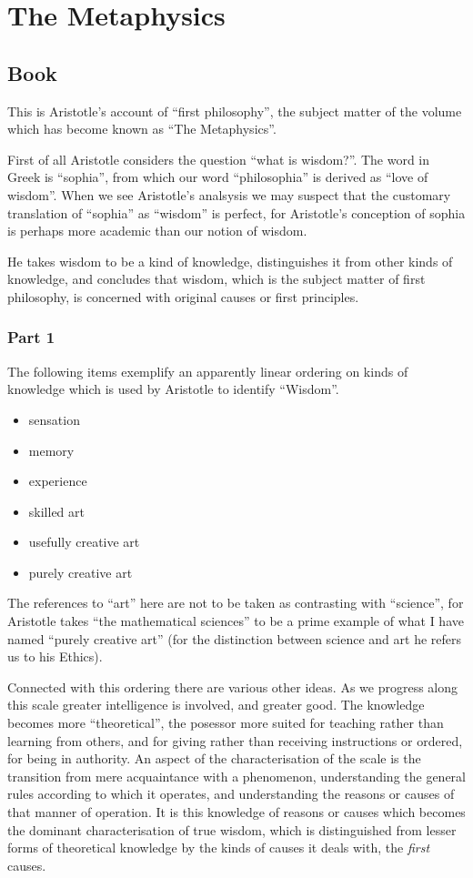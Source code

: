 \chapter{The Metaphysics}

\section{Book \RbjAlpha}

This is Aristotle's account of ``first philosophy'', the subject matter of the volume which has become known as ``The Metaphysics''.

First of all Aristotle considers the question ``what is wisdom?''.
The word in Greek is ``sophia'', from which our word ``philosophia'' is derived as ``love of wisdom''.
When we see Aristotle's analsysis we may suspect that the customary translation of ``sophia'' as ``wisdom'' is perfect, for Aristotle's conception of sophia is perhaps more academic than our notion of wisdom.

He takes wisdom to be a kind of knowledge, distinguishes it from other kinds of knowledge, and concludes that wisdom, which is the subject matter of first philosophy, is concerned with original causes or first principles.


\subsection{Part 1}

The following items exemplify an apparently linear ordering on kinds of knowledge which is used by Aristotle to identify ``Wisdom''.

\begin{itemize}
\item sensation
\item memory
\item experience
\item skilled art
\item usefully creative art
\item purely creative art
\end{itemize}

The references to ``art'' here are not to be taken as contrasting with ``science'', for Aristotle takes ``the mathematical sciences'' to be a prime example of what I have named ``purely creative art'' (for the distinction between science and art he refers us to his Ethics).

Connected with this ordering there are various other ideas.
As we progress along this scale greater intelligence is involved, and greater good.
The knowledge becomes more ``theoretical'', the posessor more suited for teaching rather than learning from others, and for giving rather than receiving instructions or ordered, for being in authority.
An aspect of the characterisation of the scale is the transition from mere acquaintance with a phenomenon, understanding the general rules according to which it operates, and understanding the reasons or causes of that manner of operation.
It is this knowledge of reasons or causes which becomes the dominant characterisation of true wisdom, which is distinguished from lesser forms of theoretical knowledge by the kinds of causes it deals with, the \emph{first} causes.

